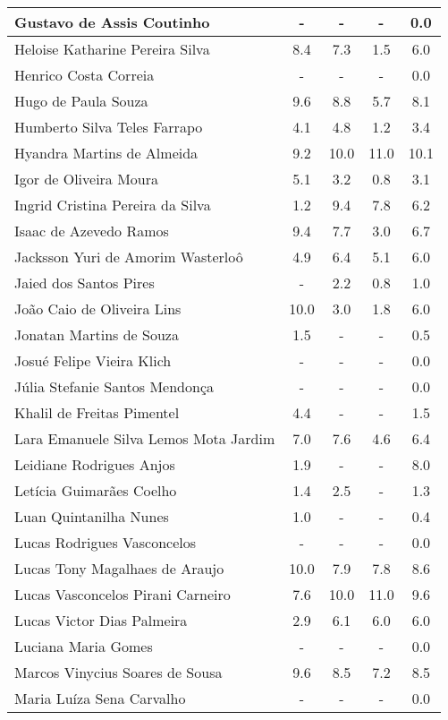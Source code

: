 \documentclass{article}
\begin{document}
\begin{longtable}{|l|c|c|c|c|}
Gustavo de Assis Coutinho & - & - & - & 0.0\\\hline
Heloise Katharine Pereira Silva & 8.4 & 7.3 & 1.5 & 6.0\\\hline
Henrico Costa Correia & - & - & - & 0.0\\\hline
Hugo de Paula Souza & 9.6 & 8.8 & 5.7 & 8.1\\\hline
Humberto Silva Teles Farrapo & 4.1 & 4.8 & 1.2 & 3.4\\\hline
Hyandra Martins de Almeida & 9.2 & 10.0 & 11.0 & 10.1\\\hline
Igor de Oliveira Moura & 5.1 & 3.2 & 0.8 & 3.1\\\hline
Ingrid Cristina Pereira da Silva & 1.2 & 9.4 & 7.8 & 6.2\\\hline
Isaac de Azevedo Ramos & 9.4 & 7.7 & 3.0 & 6.7\\\hline
Jacksson Yuri de Amorim Wasterloô & 4.9 & 6.4 & 5.1 & 6.0\\\hline
Jaied dos Santos Pires & - & 2.2 & 0.8 & 1.0\\\hline
João Caio de Oliveira Lins & 10.0 & 3.0 & 1.8 & 6.0\\\hline
Jonatan Martins de Souza & 1.5 & - & - & 0.5\\\hline
Josué Felipe Vieira Klich & - & - & - & 0.0\\\hline
Júlia Stefanie Santos Mendonça & - & - & - & 0.0\\\hline
Khalil de Freitas Pimentel & 4.4 & - & - & 1.5\\\hline
Lara Emanuele Silva Lemos Mota Jardim & 7.0 & 7.6 & 4.6 & 6.4\\\hline
Leidiane Rodrigues Anjos & 1.9 & - & - & 8.0\\\hline
Letícia Guimarães Coelho & 1.4 & 2.5 & - & 1.3\\\hline
Luan Quintanilha Nunes & 1.0 & - & - & 0.4\\\hline
Lucas Rodrigues Vasconcelos & - & - & - & 0.0\\\hline
Lucas Tony Magalhaes de Araujo & 10.0 & 7.9 & 7.8 & 8.6\\\hline
Lucas Vasconcelos Pirani Carneiro & 7.6 & 10.0 & 11.0 & 9.6\\\hline
Lucas Victor Dias Palmeira & 2.9 & 6.1 & 6.0 & 6.0\\\hline
Luciana Maria Gomes & - & - & - & 0.0\\\hline
Marcos Vinycius Soares de Sousa & 9.6 & 8.5 & 7.2 & 8.5\\\hline
Maria Luíza Sena Carvalho & - & - & - & 0.0\\\hline

\end{longtable}
\end{document}
